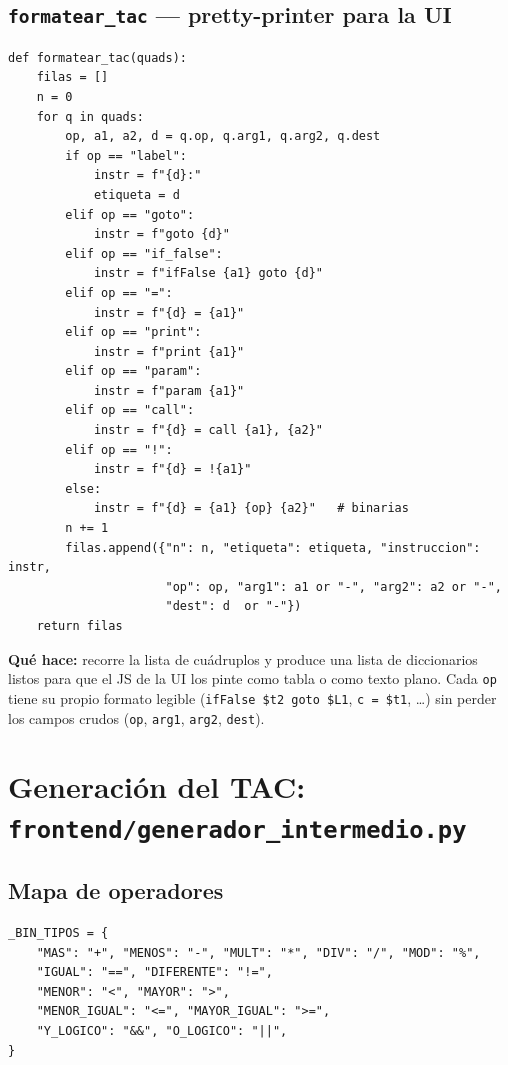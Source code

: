 \documentclass[11pt,a4paper]{article}
\begin{document}
\subsection{\texttt{formatear\_tac} --- pretty-printer para la UI}

\begin{lstlisting}[style=py]
def formatear_tac(quads):
    filas = []
    n = 0
    for q in quads:
        op, a1, a2, d = q.op, q.arg1, q.arg2, q.dest
        if op == "label":
            instr = f"{d}:"
            etiqueta = d
        elif op == "goto":
            instr = f"goto {d}"
        elif op == "if_false":
            instr = f"ifFalse {a1} goto {d}"
        elif op == "=":
            instr = f"{d} = {a1}"
        elif op == "print":
            instr = f"print {a1}"
        elif op == "param":
            instr = f"param {a1}"
        elif op == "call":
            instr = f"{d} = call {a1}, {a2}"
        elif op == "!":
            instr = f"{d} = !{a1}"
        else:
            instr = f"{d} = {a1} {op} {a2}"   # binarias
        n += 1
        filas.append({"n": n, "etiqueta": etiqueta, "instruccion": instr,
                      "op": op, "arg1": a1 or "-", "arg2": a2 or "-",
                      "dest": d  or "-"})
    return filas
\end{lstlisting}

\textbf{Qué hace:} recorre la lista de cuádruplos y produce una lista de
diccionarios listos para que el JS de la UI los pinte como tabla o como
texto plano. Cada \texttt{op} tiene su propio formato legible
(\texttt{ifFalse \$t2 goto \$L1}, \texttt{c = \$t1}, \dots) sin perder
los campos crudos (\texttt{op}, \texttt{arg1}, \texttt{arg2}, \texttt{dest}).

\section{Generación del TAC: \texttt{frontend/generador\_intermedio.py}}

\subsection{Mapa de operadores}

\begin{lstlisting}[style=py]
_BIN_TIPOS = {
    "MAS": "+", "MENOS": "-", "MULT": "*", "DIV": "/", "MOD": "%",
    "IGUAL": "==", "DIFERENTE": "!=",
    "MENOR": "<", "MAYOR": ">",
    "MENOR_IGUAL": "<=", "MAYOR_IGUAL": ">=",
    "Y_LOGICO": "&&", "O_LOGICO": "||",
}
\end{lstlisting}
\end{document}
